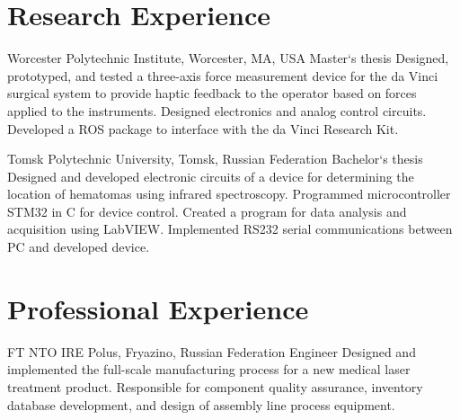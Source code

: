 \documentclass[10pt]{article} %
\begin{document}
\begin{paracol}{2}
\begin{supertabular}{rl}
\end{supertabular}

\section{Research Experience}

{} %
{Worcester Polytechnic Institute, Worcester, MA, USA} %
{Master`s thesis} %
{Designed, prototyped, and tested a three-axis force measurement device for the da Vinci surgical system to provide haptic feedback to the operator based on forces applied to the instruments. Designed electronics and analog control circuits. Developed a ROS package to interface with the da Vinci Research Kit.} %


{}
{Tomsk Polytechnic University, Tomsk, Russian Federation} %
{Bachelor`s thesis} %
{Designed and developed electronic circuits of
a device for determining the location of hematomas
using infrared spectroscopy. Programmed microcontroller
STM32 in C for device control. Created
a program for data analysis and acquisition using
LabVIEW. Implemented RS232 serial communications
between PC and developed device.}  %


\section{Professional Experience}


{FT} %
{NTO IRE Polus, Fryazino, Russian Federation} %
{Engineer} %
{Designed and implemented the full-scale manufacturing process for a new medical laser treatment product. Responsible for component quality assurance, inventory database development, and design of assembly line process equipment.} %



\end{paracol}
\end{document}
